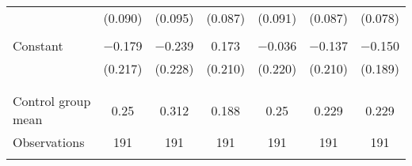 \begin{tabular}{@{\extracolsep{5pt}}lcccccc}
  & (0.090) & (0.095) & (0.087) & (0.091) & (0.087) & (0.078) \\ 
  & & & & & & \\ 
 Constant & $-$0.179 & $-$0.239 & 0.173 & $-$0.036 & $-$0.137 & $-$0.150 \\ 
  & (0.217) & (0.228) & (0.210) & (0.220) & (0.210) & (0.189) \\ 
  & & & & & & \\ 
\hline \\[-1.8ex] 
Control group mean & 0.25 & 0.312 & 0.188 & 0.25 & 0.229 & 0.229 \\ 
Observations & 191 & 191 & 191 & 191 & 191 & 191 \\ 
\hline 
\hline \\[-1.8ex] 
\end{tabular} 
